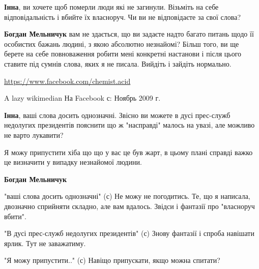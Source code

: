 \begin{itemize}
\begin{itemize}
\begin{itemize}
\textbf{Інна}, ви хочете щоб померли люди які не загинули. Візьміть на себе
відповідальність і вбийте їх власноруч. Чи ви не відповідаєте за свої слова?


\textbf{Богдан Мельничук} вам не здається, що ви задаєте надто багато питань
щодо її особистих бажань людині, з якою абсолютно незнайомі? Більш того, ви ще
берете на себе повноваження робити мені конкретні настанови і після цього
ставите під сумнів слова, яких я не писала.  Вийдіть і зайдіть нормально.

\url{https://www.facebook.com/chemist.acid}\par
A lazy wikimedian
На Facebook с: Ноябрь 2009 г.
 
\textbf{Інна}, ваші слова досить однозначні. Звісно ви можете в дусі прес-служб
недолугих президентів пояснити що ж "насправді" малось на увазі, але можливо не
варто лукавити?

 

Я можу припустити хіба що що у вас це був жарт, в цьому плані справді важко це
визначити у випадку незнайомої людини.

 
\textbf{Богдан Мельничук} 

"ваші слова досить однозначні" (с) Не можу не погодитись. Те, що я написала,
двозначно сприйняти складно, але вам вдалось. Звідси і фантазії про "власноруч
вбити".

"В дусі прес-служб недолугих президентів" (с) Знову фантазії і спроба навішати
ярлик. Тут не заважатиму.

"Я можу припустити.." (с) Навіщо припускати, якщо можна спитати?


\end{itemize}
\end{itemize}
\end{itemize}
